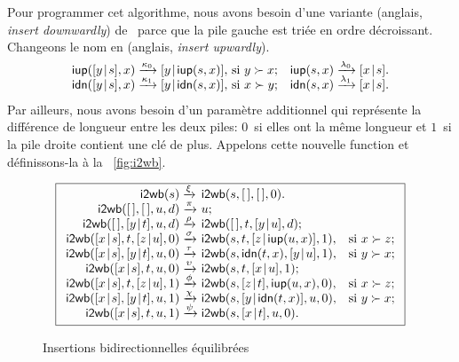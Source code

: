 Pour programmer cet algorithme, nous avons besoin d'une variante
 (anglais, \emph{insert downwardly})
de~ parce que la pile gauche est
triée en ordre décroissant. Changeons le nom  en
 (anglais, \emph{insert upwardly}).
\begin{equation*}
\begin{array}{@{}r@{\;}l@{\;}lr@{\;}l@{\;}l@{}}
  \fun{iup}(\cons{y}{s},x)
& \xrightarrow{\smash{\kappa_0}}
& \cons{y}{\fun{iup}(s,x)},\,\text{si \(y \succ x\)};
& \fun{iup}(s,x)
& \xrightarrow{\smash{\lambda_0}} & \cons{x}{s}.\\
  \fun{idn}(\cons{y}{s},x)
& \xrightarrow{\smash{\kappa_1}}
& \cons{y}{\fun{idn}(s,x)},\,\text{si \(x \succ y\)};
& \fun{idn}(s,x)
& \xrightarrow{\smash{\lambda_1}} & \cons{x}{s}.
\end{array}
\end{equation*}
Par ailleurs, nous avons besoin d'un paramètre additionnel qui
représente la différence de longueur entre les deux piles: \(0\)~si
elles ont la même longueur et \(1\)~si la pile droite contient une clé
de plus. Appelons cette nouvelle function
 et
définissons-la à la \fig~\vref{fig:i2wb}.
\begin{figure}[t]
\begin{equation*}
\boxed{%
\begin{array}{r@{\;}l@{\;}ll}
\fun{i2wb}(s)
& \xrightarrow{\smash{\xi}} & \fun{i2wb}(s,\el,\el,0).\\
\fun{i2wb}(\el,\el,u,d)
& \xrightarrow{\smash{\pi}} & u;\\
\fun{i2wb}(\el,\cons{y}{t},u,d)
& \xrightarrow{\smash{\rho}} & \fun{i2wb}(\el,t,\cons{y}{u},d);\\
\fun{i2wb}(\cons{x}{s},t,\cons{z}{u},0)
& \xrightarrow{\smash{\sigma}} &
\fun{i2wb}(s,t,\cons{z}{\fun{iup}(u,x)},1),
& \text{si \(x \succ z\)};\\
\fun{i2wb}(\cons{x}{s},\cons{y}{t},u,0)
& \xrightarrow{\smash{\tau}} &
\fun{i2wb}(s,\fun{idn}(t,x),\cons{y}{u},1),
& \text{si \(y \succ x\)};\\
\fun{i2wb}(\cons{x}{s},t,u,0)
& \xrightarrow{\smash{\upsilon}} & \fun{i2wb}(s,t,\cons{x}{u},1);\\
\fun{i2wb}(\cons{x}{s},t,\cons{z}{u},1)
& \xrightarrow{\smash{\phi}}
& \fun{i2wb}(s,\cons{z}{t},\fun{iup}(u,x),0),
& \text{si \(x \succ z\)};\\
\fun{i2wb}(\cons{x}{s},\cons{y}{t},u,1)
& \xrightarrow{\smash{\chi}}
& \fun{i2wb}(s,\cons{y}{\fun{idn}(t,x)},u,0),
& \text{si \(y \succ x\)};\\
\fun{i2wb}(\cons{x}{s},t,u,1) & \xrightarrow{\smash{\psi}} &
\fun{i2wb}(s,\cons{x}{t},u,0).
\end{array}}
\end{equation*}
\caption{Insertions bidirectionnelles équilibrées}
\label{fig:i2wb}
\end{figure}
